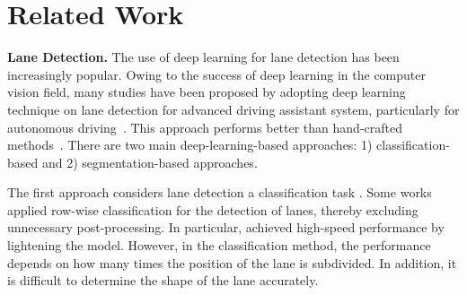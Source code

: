 \documentclass[10pt,twocolumn,letterpaper]{article}
\begin{document}
\section{Related Work}
\noindent
\textbf{Lane Detection.} The use of deep learning for lane detection has been increasingly popular. Owing to the success of deep learning in the computer vision field, many studies have been proposed by adopting deep learning technique on lane detection for advanced driving assistant system, particularly for autonomous driving~\cite{neven2018towards, pan2017spatial, hou2019learning, qin2020ultra, yoo2020end}. This approach performs better than hand-crafted methods~\cite{ek2004lane, sun2006hsi, wang2000lane, kim2008robust}. There are two main deep-learning-based approaches: 1) classification-based and 2) segmentation-based approaches.

The first approach considers lane detection a classification task \cite{qin2020ultra, yoo2020end, chougule2018reliable}. Some works \cite{qin2020ultra, yoo2020end} applied row-wise classification for the detection of lanes, thereby excluding unnecessary post-processing. In particular, \cite{qin2020ultra} achieved high-speed performance by lightening the model. However, in the classification method, the performance depends on how many times the position of the lane is subdivided. In addition, it is difficult to determine the shape of the lane accurately.
\end{document}
